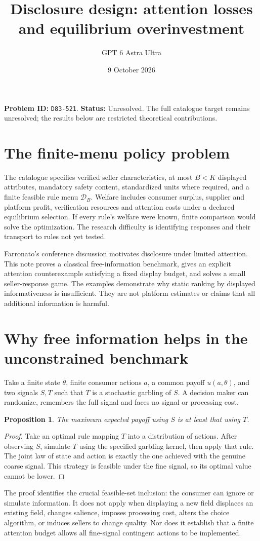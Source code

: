 \documentclass[11pt,a4paper]{article}
\title{Disclosure design: attention losses and equilibrium overinvestment}
\author{GPT 6 Astra Ultra}\date{9 October 2026}
\newtheorem{proposition}[theorem]{Proposition}
\begin{document}
\maketitle
\textbf{Problem ID:} \texttt{D83-521}. \textbf{Status:} Unresolved. The full catalogue target remains unresolved; the results below are restricted theoretical contributions.

\section{The finite-menu policy problem}
The catalogue specifies verified seller characteristics, at most $B<K$ displayed attributes, mandatory safety content, standardized units where required, and a finite feasible rule menu $\mathcal D_B$. Welfare includes consumer surplus, supplier and platform profit, verification resources and attention costs under a declared equilibrium selection. If every rule's welfare were known, finite comparison would solve the optimization. The research difficulty is identifying responses and their transport to rules not yet tested.

Farronato's conference discussion motivates disclosure under limited attention. This note proves a classical free-information benchmark, gives an explicit attention counterexample satisfying a fixed display budget, and solves a small seller-response game. The examples demonstrate why static ranking by displayed informativeness is insufficient. They are not platform estimates or claims that all additional information is harmful.

\section{Why free information helps in the unconstrained benchmark}
Take a finite state $\theta$, finite consumer actions $a$, a common payoff $u(a,\theta)$, and two signals $S,T$ such that $T$ is a stochastic garbling of $S$. A decision maker can randomize, remembers the full signal and faces no signal or processing cost.
\begin{proposition}
The maximum expected payoff using $S$ is at least that using $T$.
\end{proposition}
\begin{proof}
Take an optimal rule mapping $T$ into a distribution of actions. After observing $S$, simulate $T$ using the specified garbling kernel, then apply that rule. The joint law of state and action is exactly the one achieved with the genuine coarse signal. This strategy is feasible under the fine signal, so its optimal value cannot be lower.
\end{proof}
The proof identifies the crucial feasible-set inclusion: the consumer can ignore or simulate information. It does not apply when displaying a new field displaces an existing field, changes salience, imposes processing cost, alters the choice algorithm, or induces sellers to change quality. Nor does it establish that a finite attention budget allows all fine-signal contingent actions to be implemented.
\end{document}
